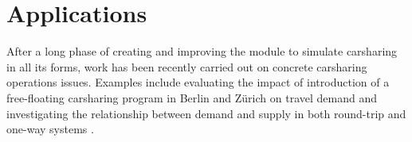 \section{Applications}
After a long phase of creating and improving the module to simulate carsharing in all its forms, work has been recently carried out on concrete carsharing operations issues. Examples include evaluating the impact of introduction of a free-floating carsharing program in Berlin \citep[][]{CiariEtAl_TRR_2014} and Zürich \citep[][]{CiariEtAl_Transportation_2014} on travel demand and investigating the relationship between demand and supply in both round-trip and one-way systems \citep[][]{BalacEtAl_TRB_2015}.




